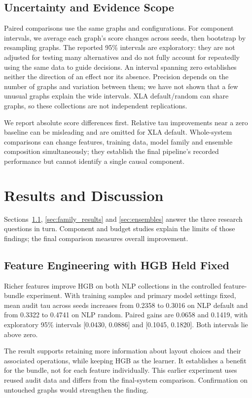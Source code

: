 \documentclass[letterpaper]{article}
\begin{document}
\subsection{Uncertainty and Evidence Scope}
Paired comparisons use the same graphs and configurations. For component intervals, we average each graph's score changes across seeds, then bootstrap by resampling graphs. The reported 95\% intervals are exploratory: they are not adjusted for testing many alternatives and do not fully account for repeatedly using the same data to guide decisions. An interval spanning zero establishes neither the direction of an effect nor its absence. Precision depends on the number of graphs and variation between them; we have not shown that a few unusual graphs explain the wide intervals. XLA default/random can share graphs, so these collections are not independent replications.

We report absolute score differences first. Relative tau improvements near a zero baseline can be misleading and are omitted for XLA default. Whole-system comparisons can change features, training data, model family and ensemble composition simultaneously; they establish the final pipeline's recorded performance but cannot identify a single causal component.

\section{Results and Discussion}
Sections~\ref{sec:feature_results}, \ref{sec:family_results} and \ref{sec:ensembles} answer the three research questions in turn. Component and budget studies explain the limits of those findings; the final comparison measures overall improvement.

\subsection{Feature Engineering with HGB Held Fixed}
\label{sec:feature_results}
Richer features improve HGB on both NLP collections in the controlled feature-bundle experiment. With training samples and primary model settings fixed, mean audit tau across seeds increases from 0.2358 to 0.3016 on NLP default and from 0.3322 to 0.4741 on NLP random. Paired gains are 0.0658 and 0.1419, with exploratory 95\% intervals [0.0430, 0.0886] and [0.1045, 0.1820]. Both intervals lie above zero.

The result supports retaining more information about layout choices and their associated operations, while keeping HGB as the learner. It establishes a benefit for the bundle, not for each feature individually. This earlier experiment uses reused audit data and differs from the final-system comparison. Confirmation on untouched graphs would strengthen the finding.
\end{document}
